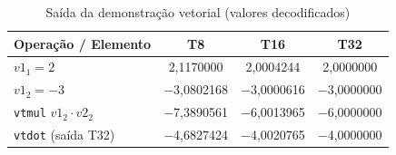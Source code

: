\documentclass[journal]{IEEEtran}
\begin{document}
\begin{table}[!t]
\renewcommand{\arraystretch}{1.12}
\caption{Saída da demonstração vetorial (valores decodificados)}
\label{tab:demo}
\centering
\begin{tabular}{l c c c}
\hline
Operação / Elemento & T8 & T16 & T32 \\
\hline
$v1_1 = 2$            & 2,1170000 & 2,0004244 & 2,0000000 \\
$v1_2 = -3$           & $-$3,0802168 & $-$3,0000616 & $-$3,0000000 \\
\texttt{vtmul} $v1_2 \cdot v2_2$ & $-$7,3890561 & $-$6,0013965 & $-$6,0000000 \\
\texttt{vtdot} (saída T32)  & $-$4,6827424 & $-$4,0020765 & $-$4,0000000 \\
\hline
\end{tabular}
\end{table}
\end{document}
